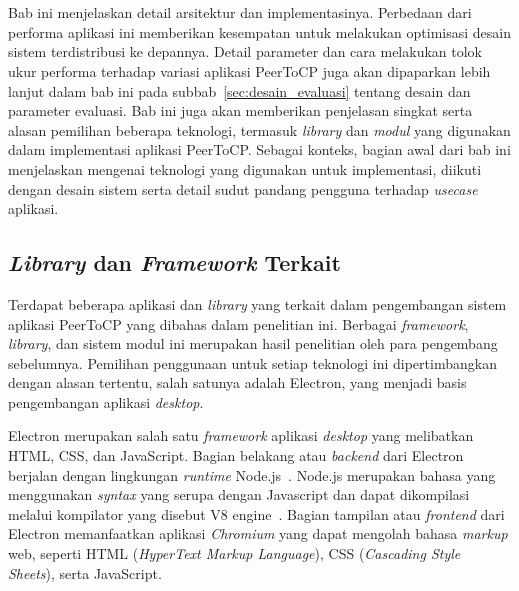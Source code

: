 \chapter{\babEmpat}
\label{bab:4}

Bab ini menjelaskan detail arsitektur dan implementasinya. Perbedaan dari performa aplikasi ini memberikan kesempatan untuk melakukan optimisasi desain sistem terdistribusi ke depannya. Detail parameter dan cara melakukan tolok ukur performa terhadap variasi aplikasi PeerToCP juga akan dipaparkan lebih lanjut dalam bab ini pada subbab~\ref{sec:desain_evaluasi} tentang desain dan parameter evaluasi. Bab ini juga akan memberikan penjelasan singkat serta alasan pemilihan beberapa teknologi, termasuk \textit{library} dan \textit{modul} yang digunakan dalam implementasi aplikasi PeerToCP. Sebagai konteks, bagian awal dari bab ini menjelaskan mengenai teknologi yang digunakan untuk implementasi, diikuti dengan desain sistem serta detail sudut pandang pengguna terhadap \textit{usecase} aplikasi.

\section{\textit{Library} dan \textit{Framework} Terkait}

Terdapat beberapa aplikasi dan \textit{library} yang terkait dalam pengembangan sistem aplikasi PeerToCP yang dibahas dalam penelitian ini. Berbagai \textit{framework}, \textit{library}, dan sistem modul ini merupakan hasil penelitian oleh para pengembang sebelumnya. Pemilihan penggunaan untuk setiap teknologi ini dipertimbangkan dengan alasan tertentu, salah satunya adalah Electron, yang menjadi basis pengembangan aplikasi \textit{desktop}.

Electron merupakan salah satu \textit{framework} aplikasi \textit{desktop} yang melibatkan HTML, CSS, dan JavaScript. Bagian belakang atau \textit{backend} dari Electron berjalan dengan lingkungan \textit{runtime} Node.js~\citep{kredpattanakul2018transforming, miglanielectron}. Node.js merupakan bahasa yang menggunakan \textit{syntax} yang serupa dengan Javascript dan dapat dikompilasi melalui kompilator yang disebut V8 engine~\citep{tilkov2010node}. Bagian tampilan atau \textit{frontend} dari Electron memanfaatkan aplikasi \textit{Chromium} yang dapat mengolah bahasa \textit{markup} web, seperti HTML (\textit{HyperText Markup Language}), CSS (\textit{Cascading Style Sheets}), serta JavaScript.


